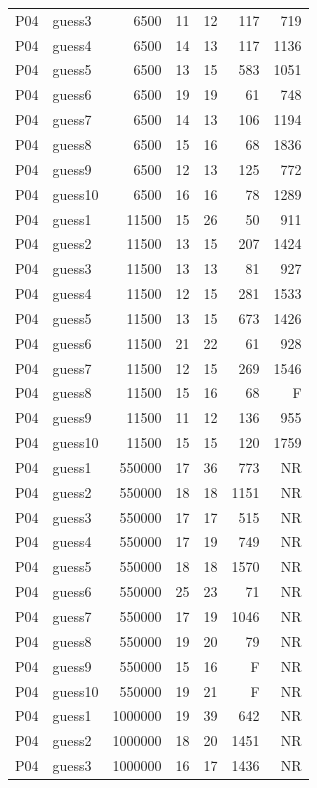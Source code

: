 {\begin{longtable}{llrrrrr}
P04 & guess3 & 6500 & 11 & 12 & 117 & 719 \\
P04 & guess4 & 6500 & 14 & 13 & 117 & 1136 \\
P04 & guess5 & 6500 & 13 & 15 & 583 & 1051 \\
P04 & guess6 & 6500 & 19 & 19 & 61 & 748 \\
P04 & guess7 & 6500 & 14 & 13 & 106 & 1194 \\
P04 & guess8 & 6500 & 15 & 16 & 68 & 1836 \\
P04 & guess9 & 6500 & 12 & 13 & 125 & 772 \\
P04 & guess10 & 6500 & 16 & 16 & 78 & 1289 \\
P04 & guess1 & 11500 & 15 & 26 & 50 & 911 \\
P04 & guess2 & 11500 & 13 & 15 & 207 & 1424 \\
P04 & guess3 & 11500 & 13 & 13 & 81 & 927 \\
P04 & guess4 & 11500 & 12 & 15 & 281 & 1533 \\
P04 & guess5 & 11500 & 13 & 15 & 673 & 1426 \\
P04 & guess6 & 11500 & 21 & 22 & 61 & 928 \\
P04 & guess7 & 11500 & 12 & 15 & 269 & 1546 \\
P04 & guess8 & 11500 & 15 & 16 & 68 & F \\
P04 & guess9 & 11500 & 11 & 12 & 136 & 955 \\
P04 & guess10 & 11500 & 15 & 15 & 120 & 1759 \\
P04 & guess1 & 550000 & 17 & 36 & 773 & NR \\
P04 & guess2 & 550000 & 18 & 18 & 1151 & NR \\
P04 & guess3 & 550000 & 17 & 17 & 515 & NR \\
P04 & guess4 & 550000 & 17 & 19 & 749 & NR \\
P04 & guess5 & 550000 & 18 & 18 & 1570 & NR \\
P04 & guess6 & 550000 & 25 & 23 & 71 & NR \\
P04 & guess7 & 550000 & 17 & 19 & 1046 & NR \\
P04 & guess8 & 550000 & 19 & 20 & 79 & NR \\
P04 & guess9 & 550000 & 15 & 16 & F & NR \\
P04 & guess10 & 550000 & 19 & 21 & F & NR \\
P04 & guess1 & 1000000 & 19 & 39 & 642 & NR \\
P04 & guess2 & 1000000 & 18 & 20 & 1451 & NR \\
P04 & guess3 & 1000000 & 16 & 17 & 1436 & NR \\

\end{longtable}}
